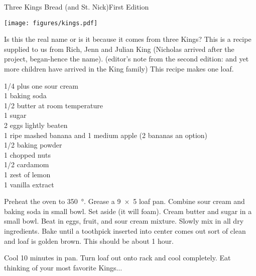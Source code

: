 \begin{entry}{Three Kings Bread (and St. Nick)}{First Edition}

\begin{center}
    \texttt{[image: figures/kings.pdf]}
\end{center}

\begin{open}
  Is this the real name or is it because it comes from three Kings?
  This is a recipe supplied to us from Rich, Jenn and Julian King (Nicholas arrived after the project, began-hence the name). (editor's note from the second edition: and yet more children have arrived in the King family)
  This recipe makes one loaf.
\end{open}
\begin{ingredients}
  \SI{1/4}{\cup} plus one \si{\tblspoon} sour cream \\
  \SI{1}{\teaspoon} baking soda \\
  \SI{1/2}{\cup} butter at room temperature \\
  \SI{1}{\cup} sugar \\
  2 eggs lightly beaten \\
  1 ripe mashed banana and 1 medium apple (2 bananas an option) \\
  \SI{1/2}{\teaspoon} baking powder \\
  \SI{1}{\cup} chopped nuts \\
  \SI{1/2}{\teaspoon} cardamom \\
  1 zest of lemon \\
  \SI{1}{\teaspoon} vanilla extract
\end{ingredients}
Preheat the oven to \SI{350}{\degree}.  Grease a \SI{9x5}{\inch} loaf pan.
Combine sour cream and baking soda in small bowl.  Set aside (it will foam).
Cream butter and sugar in a small bowl.  Beat in eggs, fruit, and sour cream
mixture.  Slowly mix in all dry ingredients.  Bake until a toothpick inserted
into center comes out sort of clean and loaf is golden brown.  This should be
about 1 hour.

Cool 10 minutes in pan. Turn loaf out onto rack and cool completely.  Eat
thinking of your most favorite Kings$\ldots$
\end{entry}

